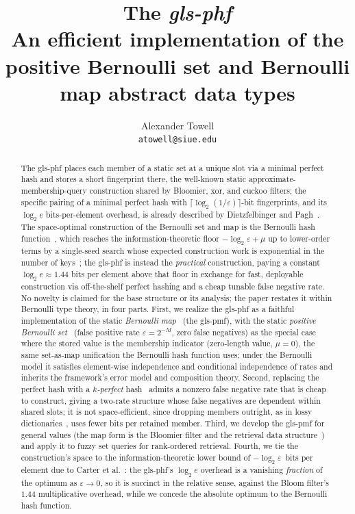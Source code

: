 \documentclass[11pt,final,hidelinks]{article}
\title
{
    The \emph{\gls*{gls-phf}}\\
    \large An efficient implementation of the positive Bernoulli set and Bernoulli map abstract data types
}
\author
{
    Alexander Towell\\
    \texttt{atowell@siue.edu}
}
\date{}
\begin{document}
\maketitle
\begin{abstract}
The \gls*{gls-phf} places each member of a static set at a unique slot via a minimal perfect hash and stores a short fingerprint there, the well-known static approximate-membership-query construction shared by Bloomier, xor, and cuckoo filters; the specific pairing of a minimal perfect hash with $\lceil\log_2(1/\varepsilon)\rceil$-bit fingerprints, and its $\log_2 e$ bits-per-element overhead, is already described by Dietzfelbinger and Pagh~\cite{dietzfelbinger2008}. The space-optimal construction of the Bernoulli set and map is the Bernoulli hash function~\cite{shs}, which reaches the information-theoretic floor $-\log_2 \varepsilon + \mu$ up to lower-order terms by a single-seed search whose expected construction work is exponential in the number of keys~\cite{lehmann2025seeds}; the \gls*{gls-phf} is instead the \emph{practical} construction, paying a constant $\log_2 e \approx 1.44$ bits per element above that floor in exchange for fast, deployable construction via off-the-shelf perfect hashing and a cheap tunable false negative rate. No novelty is claimed for the base structure or its analysis; the paper restates it within Bernoulli type theory, in four parts. First, we realize the \gls*{gls-phf} as a faithful implementation of the static \emph{Bernoulli map}~\cite{bmaps} (the \gls*{gls-pmf}), with the static \emph{positive Bernoulli set}~\cite{bsets} (false positive rate $\varepsilon = 2^{-M}$, zero false negatives) as the special case where the stored value is the membership indicator (zero-length value, $\mu = 0$), the same set-as-map unification the Bernoulli hash function uses; under the Bernoulli model it satisfies element-wise independence and conditional independence of rates and inherits the framework's error model and composition theory. Second, replacing the perfect hash with a \emph{$k$-perfect} hash~\cite{chd} admits a nonzero false negative rate that is cheap to construct, giving a two-rate structure whose false negatives are dependent within shared slots; it is not space-efficient, since dropping members outright, as in lossy dictionaries~\cite{pagh2001lossy}, uses fewer bits per retained member. Third, we develop the \gls*{gls-pmf} for general values (the map form is the Bloomier filter and the retrieval data structure~\cite{bloomier,dietzfelbinger2008}) and apply it to fuzzy set queries for rank-ordered retrieval. Fourth, we tie the construction's space to the information-theoretic lower bound of $-\log_2 \varepsilon$~bits per element due to Carter et al.~\cite{carter1978}: the \gls*{gls-phf}'s $\log_2 e$ overhead is a vanishing \emph{fraction} of the optimum as $\varepsilon \to 0$, so it is succinct in the relative sense, against the Bloom filter's $1.44$ multiplicative overhead, while we concede the absolute optimum to the Bernoulli hash function.
\end{abstract}

\end{document}
